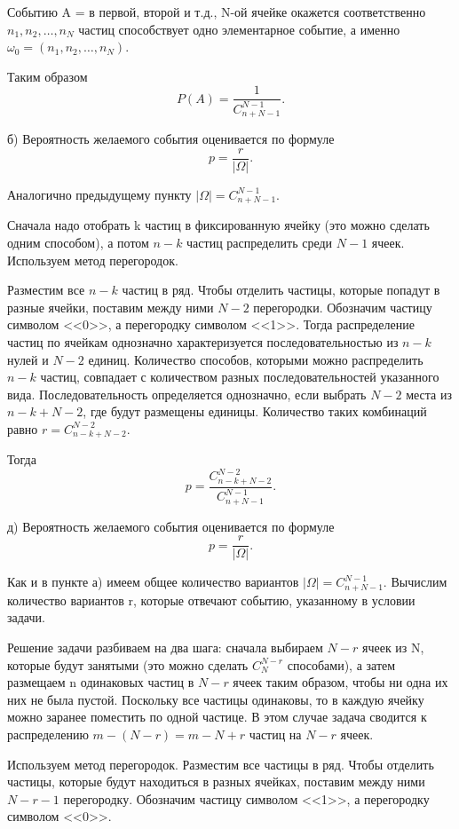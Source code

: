 \documentclass{book}
\begin{document}
Событию A = { в первой, второй и т.д., N-ой ячейке окажется соответственно $ n_1, n_2, \dotsc , n_N $ частиц}
способствует одно элементарное событие, а именно
$ \omega_0 = \left( n_1, n_2, \dotsc , n_N \right) $.

Таким образом
$$ P(A) =
\frac{1}{C_{n+N-1}^{N-1}}. $$

б) Вероятность желаемого события оценивается по формуле
$$ p =
\frac{r}{| \Omega |}.$$

Аналогично предыдущему пункту $  | \Omega | = C_{n+N-1}^{N-1}  $.

Сначала надо отобрать k частиц в фиксированную ячейку (это можно сделать одним способом), а потом
$ n - k $
частиц распределить среди
$ N - 1 $ ячеек.
Используем метод перегородок.

Разместим все $ n - k $ частиц в ряд.
Чтобы отделить частицы, которые попадут в разные ячейки, поставим между ними $ N - 2 $ перегородки.
Обозначим частицу символом <<0>>, а перегородку символом <<1>>.
Тогда распределение частиц по ячейкам однозначно характеризуется последовательностью из $ n - k $ нулей и $ N - 2$ единиц.
Количество способов, которыми можно распределить
$ n - k $
частиц, совпадает с количеством разных последовательностей указанного вида.
Последовательность определяется однозначно, если выбрать $ N - 2 $ места из $ n - k + N - 2 $, где будут размещены единицы.
Количество таких комбинаций равно $ r = C_{n-k+N-2}^{N-2} $.

Тогда
$$ p =
\frac{C_{n-k+N-2}^{N-2}}{C_{n+N-1}^{N-1}}.$$

д) Вероятность желаемого события оценивается по формуле
$$ p =
\frac{r}{| \Omega |}.$$

Как и в пункте а) имеем общее количество вариантов $ | \Omega | = C_{n+N-1}^{N-1} $.
Вычислим количество вариантов r, которые отвечают событию, указанному в условии задачи.

Решение задачи разбиваем на два шага:
сначала выбираем $ N - r $ ячеек из N, которые будут занятыми (это можно сделать $ C_{N}^{N-r} $ способами),
а затем размещаем n одинаковых частиц в $ N - r $ ячеек таким образом, чтобы ни одна их них не была пустой.
Поскольку все частицы одинаковы, то в каждую ячейку можно заранее поместить по одной частице.
В этом случае задача сводится к распределению $ m - \left( N - r \right) = m - N + r $ частиц на $ N - r $ ячеек.

Используем метод перегородок.
Разместим все частицы в ряд.
Чтобы отделить частицы, которые будут находиться в разных ячейках, поставим между ними $ N - r - 1 $ перегородку.
Обозначим частицу символом <<1>>, а перегородку символом <<0>>.
\end{document}
